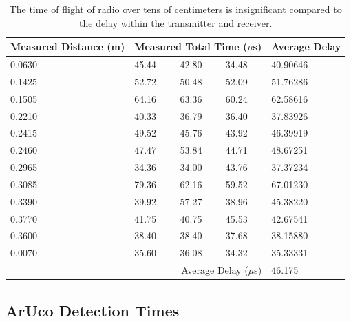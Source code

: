 \documentclass{article}
\begin{document}
    \begin{table}[H]
      \begin{tabular}{|l|l|l|l|l|}
        \hline
        Measured Distance (m) & \multicolumn{3}{|l|}{Measured Total Time ($\mu$s)} & Average Delay \\
        \hline
        0.0630 & 45.44 & 42.80 & 34.48 & 40.90646 \\
        0.1425 & 52.72 & 50.48 & 52.09 & 51.76286 \\
        0.1505 & 64.16 & 63.36 & 60.24 & 62.58616 \\
        0.2210 & 40.33 & 36.79 & 36.40 & 37.83926 \\
        0.2415 & 49.52 & 45.76 & 43.92 & 46.39919 \\
        0.2460 & 47.47 & 53.84 & 44.71 & 48.67251 \\
        0.2965 & 34.36 & 34.00 & 43.76 & 37.37234 \\
        0.3085 & 79.36 & 62.16 & 59.52 & 67.01230 \\
        0.3390 & 39.92 & 57.27 & 38.96 & 45.38220 \\
        0.3770 & 41.75 & 40.75 & 45.53 & 42.67541 \\
        0.3600 & 38.40 & 38.40 & 37.68 & 38.15880 \\
        0.0070 & 35.60 & 36.08 & 34.32 & 35.33331 \\
        \hline
        \multicolumn{4}{|r|}{Average Delay ($\mu$s)} & 46.175 \\
        \hline
      \end{tabular}
      \caption{The time of flight of radio over tens of centimeters is insignificant compared to the delay within the transmitter and receiver.}
      \label{table:rf-rx-tx}
    \end{table}

  \subsection{ArUco Detection Times}\label{appendix:tag_detection}
\end{document}
